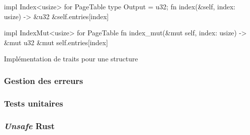 \begin{code}
\begin{rustcode}
impl Index<usize> for PageTable {
    type Output = u32;
    fn index(&self, index: usize) -> &u32 {
        &self.entries[index]
    }
}

impl IndexMut<usize> for PageTable {
    fn index_mut(&mut self, index: usize) -> &mut u32 {
        &mut self.entries[index]
    }
}
\end{rustcode}
\caption{Implémentation de traits pour une structure}
\label{lst:rust:traits}
\end{code} \bigbreak

\subsubsection{Gestion des erreurs}

\subsubsection{Tests unitaires}

\subsubsection{\textit{Unsafe} Rust}
